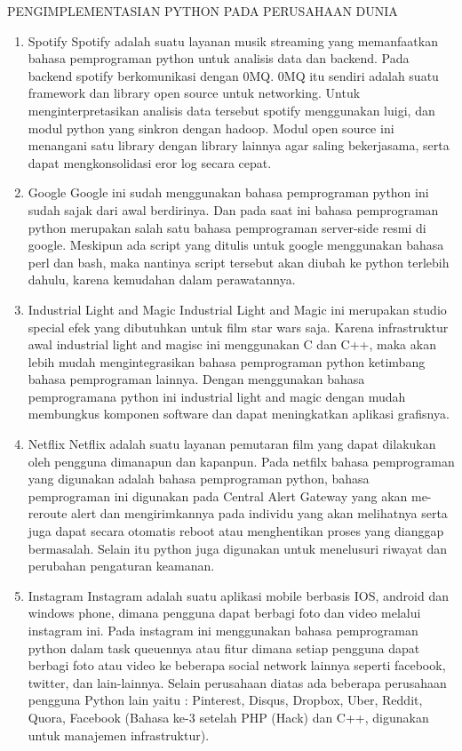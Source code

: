 PENGIMPLEMENTASIAN PYTHON PADA PERUSAHAAN DUNIA
\begin{enumerate}
\item	Spotify
Spotify adalah suatu layanan musik streaming yang memanfaatkan bahasa pemprograman python untuk analisis data dan backend. Pada backend spotify berkomunikasi dengan 0MQ. 0MQ itu sendiri adalah suatu framework dan library open source untuk networking. Untuk menginterpretasikan analisis data tersebut spotify menggunakan luigi, dan modul python yang sinkron dengan hadoop. Modul open source ini menangani satu library dengan library lainnya agar saling bekerjasama, serta dapat mengkonsolidasi eror log secara cepat.
\item	Google
Google ini sudah menggunakan bahasa pemprograman python ini sudah sajak dari awal berdirinya. Dan pada saat ini bahasa pemprograman python merupakan salah satu bahasa pemprograman server-side resmi di google. Meskipun ada script yang ditulis untuk google menggunakan bahasa perl dan bash, maka nantinya script tersebut akan diubah ke python terlebih dahulu, karena kemudahan dalam perawatannya.
\item	Industrial Light and Magic
Industrial Light and Magic ini merupakan studio special efek yang dibutuhkan untuk film star wars saja. Karena infrastruktur awal industrial light and magisc ini menggunakan C dan C++, maka akan lebih mudah mengintegrasikan bahasa pemprograman python ketimbang bahasa pemprograman lainnya. Dengan menggunakan bahasa pemprogramana python ini industrial light and magic dengan mudah membungkus komponen software dan dapat meningkatkan aplikasi grafisnya.
\item	Netflix
Netflix adalah suatu layanan pemutaran film yang dapat dilakukan oleh pengguna dimanapun dan kapanpun. Pada netfilx bahasa pemprograman yang digunakan adalah bahasa pemprograman python, bahasa pemprograman ini digunakan pada Central Alert Gateway yang akan me-reroute alert dan mengirimkannya pada individu yang akan melihatnya serta juga  dapat secara otomatis reboot atau menghentikan proses yang dianggap bermasalah. Selain itu python juga digunakan untuk menelusuri riwayat dan perubahan pengaturan keamanan.
\item	Instagram
Instagram adalah suatu aplikasi mobile berbasis IOS, android dan windows phone, dimana pengguna dapat berbagi foto dan video melalui instagram ini. Pada instagram ini menggunakan bahasa pemprograman python dalam task queuennya atau fitur dimana setiap pengguna dapat berbagi foto atau video ke beberapa social network lainnya seperti facebook, twitter, dan lain-lainnya.
Selain perusahaan diatas ada beberapa perusahaan pengguna Python lain yaitu : Pinterest, Disqus, Dropbox, Uber, Reddit, Quora, Facebook (Bahasa ke-3 setelah PHP (Hack) dan C++, digunakan untuk manajemen infrastruktur).
\end{enumerate}

